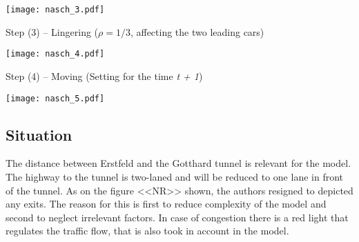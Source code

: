 \texttt{[image: nasch\_3.pdf]}\vspace*{1cm}

Step (3) -- Lingering ($\rho = 1/3$, affecting the two leading cars)\\ \vspace{-.2cm}

\texttt{[image: nasch\_4.pdf]}\vspace*{1cm}

Step (4) -- Moving (Setting for the time \textit{t + 1})\\ \vspace{-.2cm}

\texttt{[image: nasch\_5.pdf]}


\subsection{Situation}
The distance between Erstfeld and the Gotthard tunnel is relevant for the model. The highway to the tunnel is two-laned and will be reduced to one lane in front of the tunnel. As on the figure <<NR>> shown, the authors resigned to depicted any exits. The reason for this is first to reduce complexity of the model and second to neglect irrelevant factors. In case of congestion there is a red light that regulates the traffic flow, that is also took in account in the model. 


